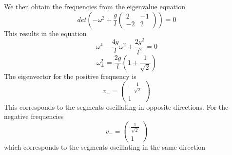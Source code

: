 We then obtain the frequencies from the eigenvalue equation
\begin{equation}
det \left( -\omega^2 + \frac{g}{l} \left( \begin{array}{cc} 2 & -1 \\ -2 & 2\end{array} \right)\right ) = 0
\end{equation}
This results in the equation
\begin{equation}
\omega^4 - \frac{4g}{l} \omega^2 + \frac{2g^2}{l^2} = 0 
\end{equation}
\begin{equation}
\omega^2_\pm = \frac{2g}{l} \left( 1 \pm \frac{1}{\sqrt{2}}\right)
\end{equation}
The eigenvector for the positive frequency is
\begin{equation}
v_+ = \left(\begin{array}{c} -\frac{1}{\sqrt{2}} \\ 1 \end{array} \right)
\end{equation}
This corresponds to the segments oscillating in opposite directions. For the negative frequencies
\begin{equation}
v_- = \left(\begin{array}{c} \frac{1}{\sqrt{2}} \\ 1 \end{array} \right)
\end{equation}
which corresponds to the segments oscillating in the same direction


